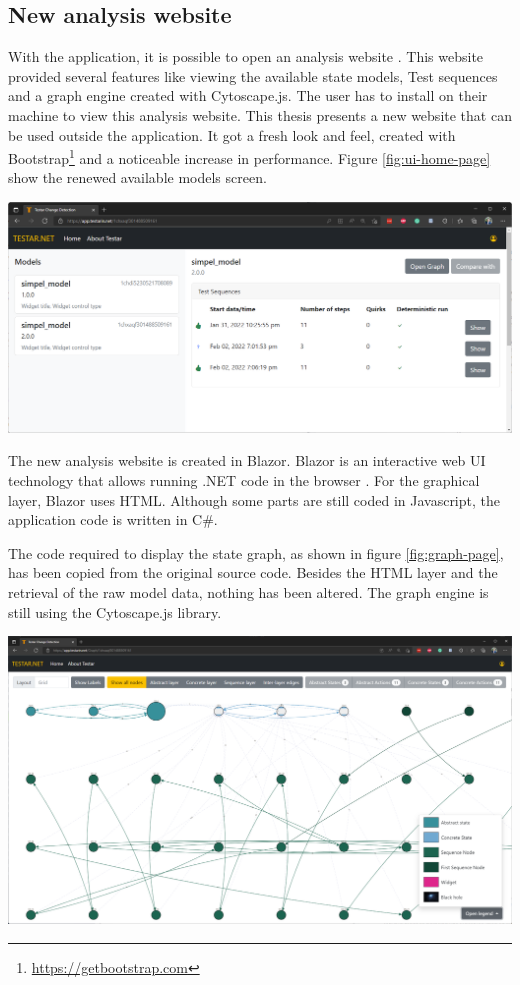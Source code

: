 \subsection{New \testar analysis website}
With the \testar application, it is possible to open an analysis website \cite{thesisMulders}. This website provided several features like viewing the available state models, Test sequences and a graph engine created with Cytoscape.js. The user has to install \testar on their machine to view this analysis website. This thesis presents a new website that can be used outside the \testar application. It got a fresh look and feel, created with Bootstrap\footnote{\url{https://getbootstrap.com}} and a noticeable increase in performance. Figure \ref{fig:ui-home-page} show the renewed available models screen. 

\begingroup
\captionsetup{type=figure}
\includegraphics[scale=0.4]{thesis/images/ui-home-page.png}
\label{fig:ui-home-page}
\endgroup

The new \testar analysis website is created in Blazor. Blazor is an interactive web UI technology that allows running .NET code in the browser \cite{what-is-blazor}. For the graphical layer, Blazor uses HTML. Although some parts are still coded in Javascript, the application code is written in C\#. 

The code required to display the state graph, as shown in figure \ref{fig:graph-page}, has been copied from the original \testar source code. Besides the HTML layer and the retrieval of the raw model data, nothing has been altered. The graph engine is still using the Cytoscape.js library. 

\begingroup
\captionsetup{type=figure}
\includegraphics[scale=0.3]{thesis/images/graph-page.png}
\label{fig:graph-page}
\endgroup


